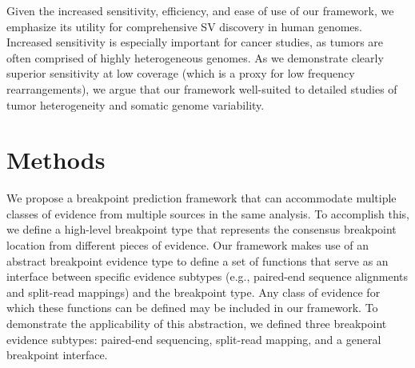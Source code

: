 \documentclass[11pt]{article}
\begin{document}
Given the increased sensitivity, efficiency, and ease of use of our framework, 
we emphasize its utility for comprehensive SV discovery in human genomes. 
Increased sensitivity is especially important for cancer studies, as tumors are 
often comprised of highly heterogeneous genomes. As we demonstrate clearly
superior sensitivity at low coverage (which is a proxy for low frequency 
rearrangements), we argue that our framework well-suited to detailed studies
	of tumor heterogeneity and somatic genome variability.\\







\section{Methods}

We propose a breakpoint prediction framework that can accommodate multiple
classes of evidence from multiple sources in the same analysis.  To accomplish
this, we define a high-level breakpoint type that represents the consensus
breakpoint location from different pieces of evidence.  Our framework makes use
of an abstract breakpoint evidence type to define a set of functions that serve
as an interface between specific evidence subtypes (e.g., paired-end sequence
alignments and split-read mappings) and the breakpoint type.  Any class of
evidence for which these functions can be defined may be included in our
framework.  To demonstrate the applicability of this abstraction, we defined
three breakpoint evidence subtypes: paired-end sequencing, split-read mapping,
and a general breakpoint interface. 
\end{document}
